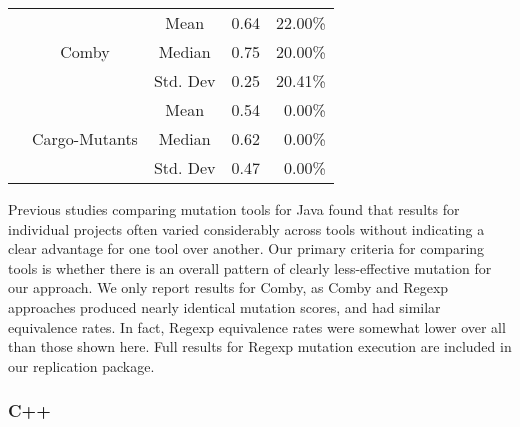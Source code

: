 \documentclass[sigconf,review, anonymous]{acmart}
\begin{document}
\begin{table}[htbp]
{\begin{tabular}{|c|c|r|r|r|r|}
 & \multirow{3}{*}{Comby} & \multicolumn{2}{c|}{Mean} & 0.64 & 22.00\%\\\cline{3-6}
    &   &  \multicolumn{2}{c|}{Median} & 0.75 & 20.00\% \\\cline{3-6}
    &   &  \multicolumn{2}{c|}{Std. Dev} & 0.25 & 20.41\% \\\cline{2-6}

 & \multirow{3}{*}{Cargo-Mutants} & \multicolumn{2}{c|}{Mean} & 0.54 & 0.00\%\\\cline{3-6}
    &   &  \multicolumn{2}{c|}{Median} & 0.62 & 0.00\% \\\cline{3-6}
    &   &  \multicolumn{2}{c|}{Std. Dev} & 0.47 & 0.00\%\\ \hline
    
    
\end{tabular}
}
\end{table}

Previous studies comparing mutation tools for Java
\cite{MajorPIT,gopinath2017does,CommACMJavaTool} found that results
for individual projects often varied considerably across tools without
indicating a clear advantage for one tool over another.  Our primary
criteria for comparing tools is whether there is an overall pattern of
clearly less-effective mutation for our approach.  We only report
results for Comby, as Comby and Regexp approaches produced nearly
identical mutation scores, and had similar equivalence rates.  In
fact, Regexp equivalence rates were somewhat lower over all than those
shown here.  Full results for Regexp mutation execution are included
in our replication package.

\subsubsection{C++}
\end{document}
